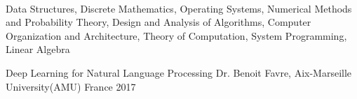 \\Data Structures, Discrete Mathematics, Operating Systems, Numerical Methods and Probability Theory, Design and Analysis of Algorithms, Computer Organization and Architecture, Theory of Computation, System Programming, Linear Algebra

\begin{cvhonors}
  \cvhonor
    {Deep Learning for Natural Language Processing}
    {Dr. Benoit Favre, Aix-Marseille University(AMU)}
    {France}
    {2017}
\end{cvhonors}